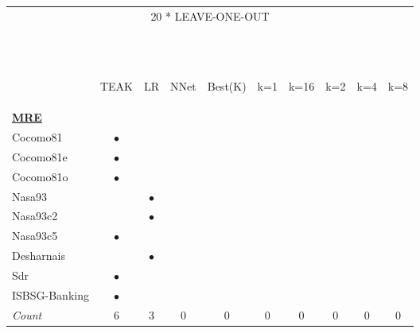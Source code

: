 \documentclass{sig-alternate}
\begin{document}
\begin{figure}[!t]
\renewcommand{\baselinestretch}{.5}
\centering
\small
  \begin{tabular}{lccccccccc|}
\multicolumn{10}{c}{20 * LEAVE-ONE-OUT }\\~\\~\\
&	\begin{sideways}\parbox{9mm}{TEAK}\end{sideways}	&	\begin{sideways}\parbox{9mm}{LR}\end{sideways}	&	\begin{sideways}\parbox{9mm}{NNet}\end{sideways}	&	\begin{sideways}\parbox{9mm}{Best(K)}\end{sideways}	&	\begin{sideways}\parbox{9mm}{k=1}\end{sideways}	&	\begin{sideways}\parbox{9mm}{k=16}\end{sideways}	&	\begin{sideways}\parbox{9mm}{k=2}\end{sideways}	&	\begin{sideways}\parbox{9mm}{k=4}\end{sideways}	&	\begin{sideways}\parbox{9mm}{k=8}\end{sideways}	\\\hline
\multicolumn{10}{l}{  \underline{{\bf MRE}}}	\\
Cocomo81	   &	$\bullet$ 	&		&		&	&		&		&		&		&		\\
Cocomo81e	    &	$\bullet$ 	&		&		&		&		&		&		&		&		\\
Cocomo81o	    &	$\bullet$ 	&		&		&		&		&		&		&		&		\\
Nasa93	        &	    &$\bullet$ 	&	&		&		&		&		&		&		\\
Nasa93c2	    &	     &$\bullet$	&	&		&		&		&		&		&		\\
Nasa93c5     	&	$\bullet$ 	 &		&	&		&		&		&		&		&		\\
Desharnais	    &		     &$\bullet$	&		&		&		&		&		&		&		\\
Sdr	            &	$\bullet$	  &		&		&		& 	&		&		&		&		\\
ISBSG-Banking	&	$\bullet$ 	 &		&		&		&		&		&		&		&		\\
\rowcolor{DarkGray}\em Count	&	$6$	&	$3$	 &	$0$	&	0	&	0	&	0	&	0	&	0	&	0	\\


\end{tabular}
\end{figure}
\end{document}
